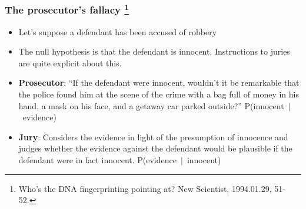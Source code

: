 \documentclass[10pt,handout]{beamer}\usepackage[]{graphicx}\usepackage[]{color}
\newcommand{\blue}[1]{\textcolor{blue}{#1}}
\begin{document}
\begin{frame}
	\frametitle{The prosecutor's fallacy \footnote{{\tiny Who's the DNA fingerprinting pointing at? New Scientist, 1994.01.29, 51-52.}}}
	
	\begin{itemize}
		\setlength\itemsep{1em}
		\item Let's suppose a defendant has been accused of robbery
		\item The null hypothesis is that the defendant is innocent. Instructions to juries are quite explicit about this. 
		\item \textbf{Prosecutor}: ``If the defendant were innocent, wouldn't it be remarkable
		that the police found him at the scene of the crime with a bag full of money in
		his hand, a mask on his face, and a getaway car parked outside?'' \mbox{P(innocent $|$ evidence)}
		\item \textbf{Jury}: Considers the evidence in light of the presumption of innocence
		and judges whether the evidence against the defendant would be plausible if
		the defendant were in fact innocent. \mbox{P(evidence $|$ innocent)}
	\end{itemize}
	
\end{frame}

\end{document}
